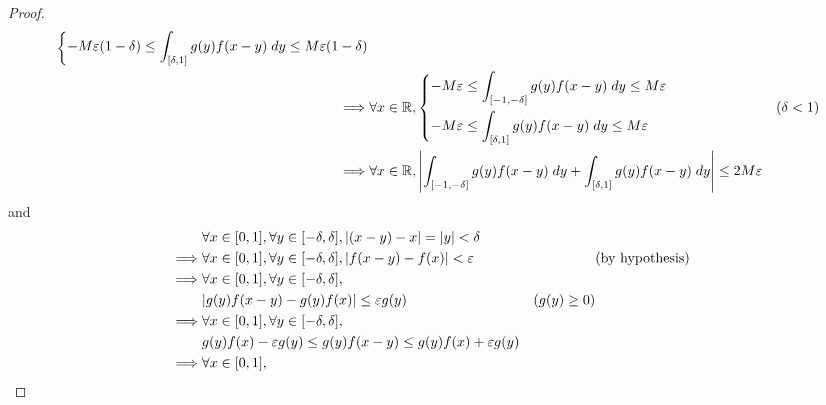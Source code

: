 \begin{proof}
\begin{align*}
\begin{dcases}
                                   -M \varepsilon (1 - \delta) \leq \int_{[\delta, 1]} g(y) f(x - y) \; dy \leq M \varepsilon (1 - \delta)
                                 \end{dcases} \\
    \implies & \forall x \in \mathbb{R}, \begin{dcases}
                                   -M \varepsilon \leq \int_{[-1, -\delta]} g(y) f(x - y) \; dy \leq M \varepsilon \\
                                   -M \varepsilon \leq \int_{[\delta, 1]} g(y) f(x - y) \; dy \leq M \varepsilon
                                 \end{dcases}                           & (\delta < 1)                           \\
    \implies & \forall x \in \mathbb{R}, \left\lvert\int_{[-1, -\delta]} g(y) f(x - y) \; dy + \int_{[\delta, 1]} g(y) f(x - y) \; dy\right\rvert \leq 2 M \varepsilon
  \end{align*}
  and
  \begin{align*}
             & \forall x \in [0, 1], \forall y \in [-\delta, \delta], \abs{(x - y) - x} = \abs{y} < \delta                                                                                     \\
    \implies & \forall x \in [0, 1], \forall y \in [-\delta, \delta], \abs{f(x - y) - f(x)} < \varepsilon                                    &                        & \text{(by hypothesis)} \\
    \implies & \forall x \in [0, 1], \forall y \in [-\delta, \delta],                                                                                                                          \\
             & \abs{g(y) f(x - y) - g(y) f(x)} \leq \varepsilon g(y)                                                                         & (g(y) \geq 0)                                   \\
    \implies & \forall x \in [0, 1], \forall y \in [-\delta, \delta],                                                                                                                          \\
             & g(y) f(x) - \varepsilon g(y) \leq g(y) f(x - y) \leq g(y) f(x) + \varepsilon g(y)                                                                                               \\
    \implies & \forall x \in [0, 1],                                                                                                                                                           \\

\end{align*}
\end{proof}
